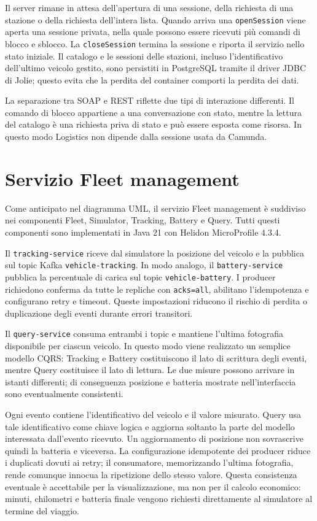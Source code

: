 \documentclass[12pt,a4paper,twoside]{report}
\newcommand{\code}[1]{\texttt{#1}}
\begin{document}
Il server rimane in attesa dell'apertura di una sessione, della richiesta di
una stazione o della richiesta dell'intera lista. Quando arriva una
\code{openSession} viene aperta una sessione privata, nella quale possono
essere ricevuti più comandi di blocco e sblocco. La \code{closeSession}
termina la sessione e riporta il servizio nello stato iniziale. Il catalogo e
le sessioni delle stazioni, incluso
l'identificativo dell'ultimo veicolo gestito, sono persistiti in PostgreSQL
tramite il driver JDBC di Jolie; questo evita che la perdita del container
comporti la perdita dei dati.

La separazione tra SOAP e REST riflette due tipi di interazione differenti.
Il comando di blocco appartiene a una conversazione con stato, mentre la
lettura del catalogo è una richiesta priva di stato e può essere esposta come
risorsa. In questo modo Logistics non dipende dalla sessione usata da
Camunda.

\section{Servizio Fleet management}

Come anticipato nel diagramma UML, il servizio Fleet management è suddiviso
nei componenti Fleet, Simulator, Tracking, Battery e Query. Tutti questi
componenti sono implementati in Java 21 con Helidon MicroProfile 4.3.4.

Il \code{tracking-service} riceve dal simulatore la posizione del veicolo e
la pubblica sul topic Kafka \code{vehicle-tracking}. In modo analogo, il
\code{battery-service} pubblica la percentuale di carica sul topic
\code{vehicle-battery}. I producer richiedono conferma da tutte le repliche
con \code{acks=all}, abilitano l'idempotenza e configurano retry e timeout.
Queste impostazioni riducono il rischio di perdita o duplicazione degli
eventi durante errori transitori.

Il \code{query-service} consuma entrambi i topic e mantiene l'ultima
fotografia disponibile per ciascun veicolo. In questo modo viene realizzato
un semplice modello CQRS: Tracking e Battery costituiscono il lato di
scrittura degli eventi, mentre Query costituisce il lato di lettura. Le due
misure possono arrivare in istanti differenti; di conseguenza posizione e
batteria mostrate nell'interfaccia sono eventualmente consistenti.

Ogni evento contiene l'identificativo del veicolo e il valore misurato. Query
usa tale identificativo come chiave logica e aggiorna soltanto la parte del
modello interessata dall'evento ricevuto. Un aggiornamento di posizione non
sovrascrive quindi la batteria e viceversa. La configurazione idempotente dei
producer riduce i duplicati dovuti ai retry; il consumatore, memorizzando
l'ultima fotografia, rende comunque innocua la ripetizione dello stesso
valore. Questa consistenza eventuale è accettabile per la visualizzazione,
ma non per il calcolo economico: minuti, chilometri e batteria finale vengono
richiesti direttamente al simulatore al termine del viaggio.
\end{document}
